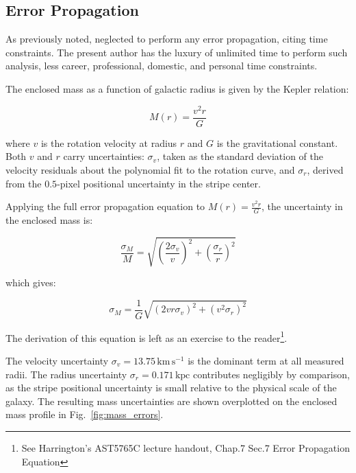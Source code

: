 \documentclass{aa}
\begin{document}
    \subsection{Error Propagation}\label{meth_error_prop}

    As previously noted, \cite{fraustro} neglected to perform any error propagation, citing time constraints. The present author has the luxury of unlimited time to perform such analysis, less career, professional, domestic, and personal time constraints.

    The enclosed mass as a function of galactic radius is given by the Kepler relation:

    \begin{equation}
    M(r) = \frac{v^2r}{G}
    \end{equation}

    where $v$ is the rotation velocity at radius $r$ and $G$ is the gravitational constant. Both $v$ and $r$ carry uncertainties: $\sigma_v$, taken as the standard deviation of the velocity residuals about the polynomial fit to the rotation curve, and $\sigma_r$, derived from the $0.5$-pixel positional uncertainty in the stripe center.

    Applying the full error propagation equation to $M(r) = \frac{v^2r}{G}$, the uncertainty in the enclosed mass is:

    \begin{equation}
    \frac{\sigma_M}{M} = \sqrt{(\frac{2\sigma_v}{v})^2+(\frac{\sigma_r}{r})^2}
    \end{equation}

    which gives:

    \begin{equation}
    \sigma_M = \frac{1}{G}\sqrt{(2vr\sigma_v)^2+(v^2\sigma_r)^2}
    \end{equation}

    The derivation of this equation is left as an exercise to the reader\footnote{See Harrington's AST5765C lecture handout, Chap.7 Sec.7 Error Propagation Equation}.

    The velocity uncertainty $\sigma_v=13.75\,\text{km}\,\text{s}^{-1}$ is the dominant term at all measured radii. The radius uncertainty $\sigma_r=0.171\,\text{kpc}$ contributes negligibly by comparison, as the stripe positional uncertainty is small relative to the physical scale of the galaxy. The resulting mass uncertainties are shown overplotted on the enclosed mass profile in Fig.~\ref{fig:mass_errors}.
    
\end{document}
